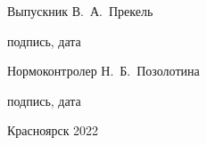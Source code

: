\begin{spacing}{1}
    Выпускник
    \hfill
    \uline{\hspace{10ex}}
    \hspace{31.9ex}
    {В.~А.~Прекель}
    \par
    \vspace{-4pt}
    \par
    \hfill
    {\footnotesize подпись, дата}
    \hspace{46.1ex}

    Нормоконтролер
    \hfill
    \uline{\hspace{10ex}}
    \hspace{28.8ex}
    {Н.~Б.~Позолотина}
    \par
    \vspace{-4pt}
    \par
    \hfill
    {\footnotesize подпись, дата}
    \hspace{46.1ex}
    \par

    \vfill

    \centerline{Красноярск 2022}

\end{spacing}

\thispagestyle{empty}

\clearpage
